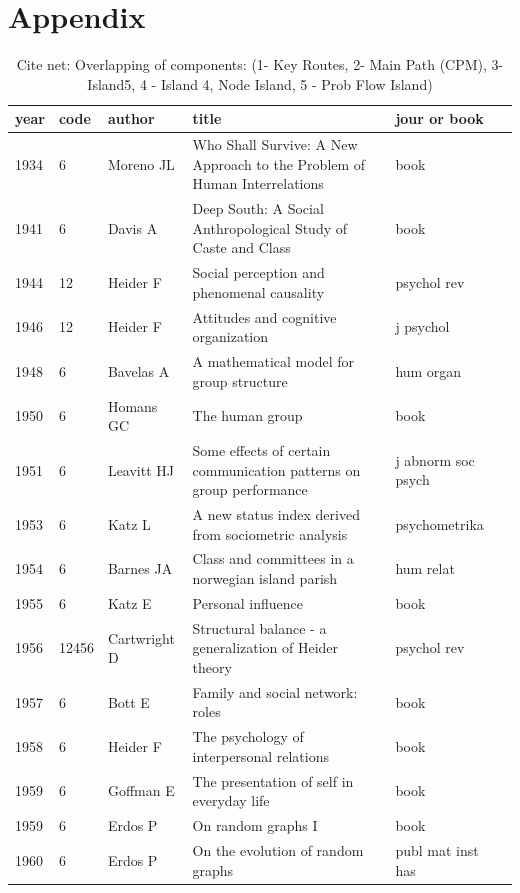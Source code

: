 \documentclass[11pt]{article} %
\newcommand{\denseFont}{\fontencoding{T1}\fontfamily{phv}\fontseries{mc}\fontshape{n}\fontsize{10}{11pt}\selectfont}
\begin{document}
\section{Appendix}
\begin{landscape}
\LTcapwidth=220mm
\denseFont
\begin{longtable}{p{0.7cm}|p{0.8cm}|p{3cm}|p{14.5cm}|p{3.5cm}l}
\caption{Cite net: \label{compareA} Overlapping of components: (1- Key Routes, 2- Main Path (CPM), 3- Island5, 4 - Island 4, Node Island, 5 - Prob Flow Island)} \\
\renewcommand{\arraystretch}{0.7}
year& 	 code& 	 author& 	 title& 	jour or book\\ \hline \endhead
1934& 	6& 	 Moreno JL& 	 Who Shall Survive: A New Approach to the Problem of Human Interrelations& 	book\\
1941& 	6& 	 Davis A & 	 Deep South: A Social Anthropological Study of Caste and Class& 	book\\
1944& 	12& 	 Heider F& 	 Social perception and phenomenal causality& 	 psychol rev\\
1946& 	12& 	 Heider F& 	 Attitudes and cognitive organization& 	 j psychol\\
1948& 	6& 	 Bavelas A& 	 A mathematical model for group structure& 	 hum organ\\
1950& 	6& 	 Homans GC& 	 The human group& 	 book\\
1951& 	6& 	 Leavitt HJ& 	 Some effects of certain communication patterns on group performance& 	 j abnorm soc psych\\
1953& 	6& 	 Katz L& 	 A new status index derived from sociometric analysis& 	 psychometrika\\
1954& 	6& 	 Barnes JA& 	 Class and committees in a norwegian island parish& 	 hum relat\\
1955& 	6& 	 Katz E& 	 Personal influence& 	 book\\
1956& 	12456& 	 Cartwright D& 	 Structural balance - a generalization of Heider theory& 	 psychol rev\\
1957& 	6& 	 Bott E& 	 Family and social network: roles& 	 book\\
1958& 	6& 	 Heider F& 	 The psychology of interpersonal relations& 	 book\\
1959& 	6& 	 Goffman E& 	 The presentation of self in everyday life& 	 book\\
1959& 	6& 	 Erdos P& 	 On random graphs I& 	 book\\
1960& 	6& 	 Erdos P& 	 On the evolution of random graphs& 	 publ mat inst has\\

\end{longtable}
\end{landscape}
\end{document}
